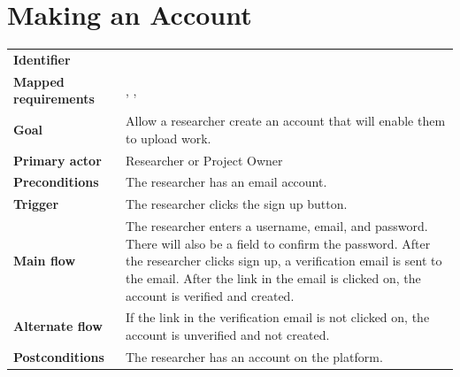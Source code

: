 \section{Making an Account}
\begin{tabularx}{\linewidth}{L{3.5cm}Y}
\toprule
\textbf{Identifier} & \\
\textbf{Mapped requirements} & , , \\
\textbf{Goal} & Allow a researcher create an account that will enable them to upload work.\\
\textbf{Primary actor} & Researcher or Project Owner\\
\textbf{Preconditions} & The researcher has an email account. \\
\textbf{Trigger} & The researcher clicks the sign up button. \\
\textbf{Main flow} & The researcher enters a username, email, and password. There will also be a field to confirm the password. After the researcher clicks sign up, a verification email is sent to the email. After the link in the email is clicked on, the account is verified and created.\\
\textbf{Alternate flow} & If the link in the verification email is not clicked on, the account is unverified and not created. \\
\textbf{Postconditions} & The researcher has an account on the platform. \\
\bottomrule
\end{tabularx}

